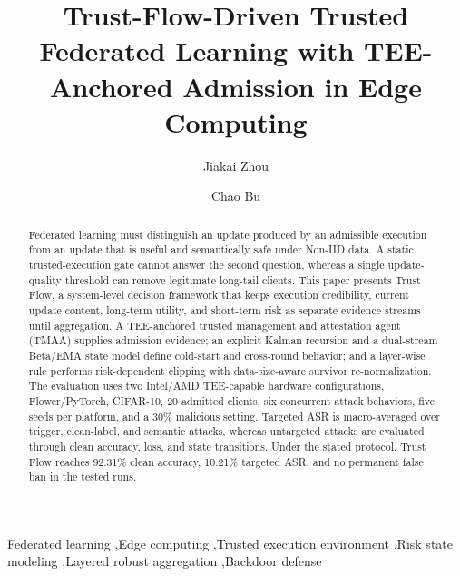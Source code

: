 \documentclass[final,5p,times,twocolumn]{elsarticle/elsarticle}
\begin{document}
\begin{frontmatter}

    \title{Trust-Flow-Driven Trusted Federated Learning with TEE-Anchored Admission in Edge Computing}

    \author[inst1]{Jiakai Zhou}
    \author[inst1]{Chao Bu}



    \begin{abstract}
        Federated learning must distinguish an update produced by an admissible
        execution from an update that is useful and semantically safe under
        Non-IID data. A static trusted-execution gate cannot answer the second
        question, whereas a single update-quality threshold can remove legitimate
        long-tail clients. This paper presents Trust Flow, a system-level
        decision framework that keeps execution credibility, current update
        content, long-term utility, and short-term risk as separate evidence
        streams until aggregation. A TEE-anchored trusted management and
        attestation agent (TMAA) supplies admission evidence; an explicit Kalman
        recursion and a dual-stream Beta/EMA state model define cold-start and
        cross-round behavior; and a layer-wise rule performs risk-dependent
        clipping with data-size-aware survivor re-normalization. The evaluation
        uses two Intel/AMD TEE-capable hardware configurations, Flower/PyTorch,
        CIFAR-10, 20 admitted clients, six concurrent attack behaviors, five
        seeds per platform, and a 30\% malicious setting. Targeted ASR is
        macro-averaged over trigger, clean-label, and semantic attacks, whereas
        untargeted attacks are evaluated through clean accuracy, loss, and state
        transitions. Under the stated protocol, Trust Flow reaches 92.31\%
        clean accuracy, 10.21\% targeted ASR, and no permanent false ban in the
        tested runs.
    \end{abstract}

    \begin{keyword}
        Federated learning \sep Edge computing \sep Trusted execution environment \sep Risk state modeling \sep Layered robust aggregation \sep Backdoor defense
    \end{keyword}

\end{frontmatter}
\end{document}
